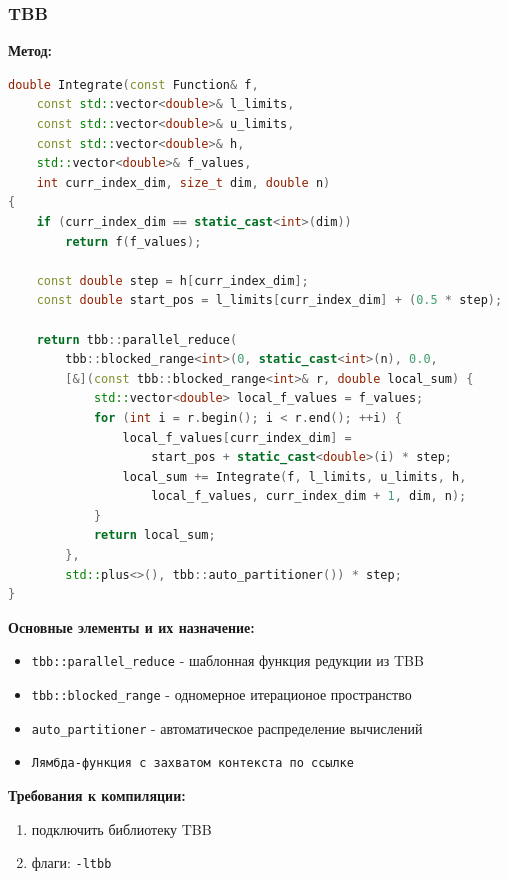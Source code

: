 \documentclass[14pt,a4paper]{article}
\begin{document}
\subsubsection{TBB}
\textbf{Метод:}

\begin{framed}
\begin{lstlisting}[language=C++]
double Integrate(const Function& f, 
    const std::vector<double>& l_limits,
    const std::vector<double>& u_limits,
    const std::vector<double>& h,
    std::vector<double>& f_values,
    int curr_index_dim, size_t dim, double n) 
{
    if (curr_index_dim == static_cast<int>(dim))
        return f(f_values);

    const double step = h[curr_index_dim];
    const double start_pos = l_limits[curr_index_dim] + (0.5 * step);

    return tbb::parallel_reduce(
        tbb::blocked_range<int>(0, static_cast<int>(n), 0.0,
        [&](const tbb::blocked_range<int>& r, double local_sum) {
            std::vector<double> local_f_values = f_values;
            for (int i = r.begin(); i < r.end(); ++i) {
                local_f_values[curr_index_dim] = 
                    start_pos + static_cast<double>(i) * step;
                local_sum += Integrate(f, l_limits, u_limits, h,
                    local_f_values, curr_index_dim + 1, dim, n);
            }
            return local_sum;
        },
        std::plus<>(), tbb::auto_partitioner()) * step;
}
\end{lstlisting}
\end{framed}


\textbf{Основные элементы и их назначение:}
\begin{itemize}
\item \texttt{tbb::parallel\_reduce} - шаблонная функция редукции из TBB
\item \texttt{tbb::blocked\_range} - одномерное итерационое пространство
\item \texttt{auto\_partitioner} - автоматическое распределение вычислений
\item \texttt{Лямбда-функция с захватом контекста по ссылке}
\end{itemize}

\textbf{Требования к компиляции:}
\begin{enumerate}
\item подключить библиотеку TBB
\item флаги: \texttt{-ltbb}
\end{enumerate}
\end{document}

